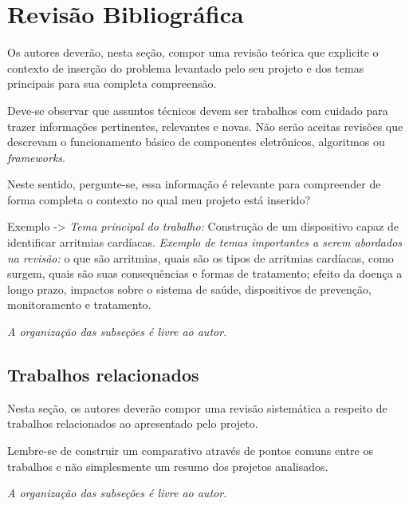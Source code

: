 \chapter{Revisão Bibliográfica}
\label{cap:revisao}

Os autores deverão, nesta seção, compor uma revisão teórica que explicite o contexto de inserção do problema levantado pelo seu projeto e dos temas principais para sua completa compreensão. 

Deve-se observar que assuntos técnicos devem ser trabalhos com cuidado para trazer informações pertinentes, relevantes e novas. Não serão aceitas revisões que descrevam o funcionamento básico de componentes eletrônicos, algoritmos ou \textit{frameworks}.

Neste sentido, pergunte-se, essa informação é relevante para compreender de forma completa o contexto no qual meu projeto está inserido? 

Exemplo -> \textit{Tema principal do trabalho:} Construção de um dispositivo capaz de identificar arritmias cardíacas. \textit{Exemplo de temas importantes a serem abordados na revisão:} o que são arritmias, quais são os tipos de arritmias cardíacas, como surgem, quais são suas consequências e formas de tratamento; efeito da doença a longo prazo, impactos sobre o sistema de saúde, dispositivos de prevenção, monitoramento e tratamento.

\textit{A organização das subseções é livre ao autor.}

\section{Trabalhos relacionados}
\label{sec:TrabalhosRelacionados}

Nesta seção, os autores deverão compor uma revisão sistemática a respeito de trabalhos relacionados ao apresentado pelo projeto.

Lembre-se de construir um comparativo através de pontos comuns entre os trabalhos e não simplesmente um resumo dos projetos analisados. 

\textit{A organização das subseções é livre ao autor.}
